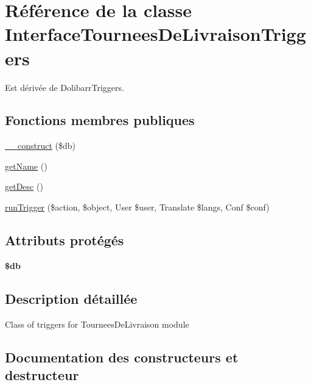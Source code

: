 \hypertarget{classInterfaceTourneesDeLivraisonTriggers}{}\section{Référence de la classe Interface\+Tournees\+De\+Livraison\+Triggers}
\label{classInterfaceTourneesDeLivraisonTriggers}


Est dérivée de Dolibarr\+Triggers.

\subsection*{Fonctions membres publiques}
\begin{DoxyCompactItemize}
\item 
\hyperlink{classInterfaceTourneesDeLivraisonTriggers_a6bc5250bff11d0e837a87370da9059ed}{\+\_\+\+\_\+construct} (\$db)
\item 
\hyperlink{classInterfaceTourneesDeLivraisonTriggers_aef5dadaa4fa37a89a1e362da148c7a85}{get\+Name} ()
\item 
\hyperlink{classInterfaceTourneesDeLivraisonTriggers_ad94600e78c409b1b3385a4c2f44bc0d4}{get\+Desc} ()
\item 
\hyperlink{classInterfaceTourneesDeLivraisonTriggers_a34392924822c757838c2580b021b30a0}{run\+Trigger} (\$action, \$object, User \$user, Translate \$langs, Conf \$conf)
\end{DoxyCompactItemize}
\subsection*{Attributs protégés}
\begin{DoxyCompactItemize}
\item 
\mbox{\label{classInterfaceTourneesDeLivraisonTriggers_a09fb07c238ffedd8d91911da6f1a7ef4}} 
{\bfseries \$db}
\end{DoxyCompactItemize}


\subsection{Description détaillée}
Class of triggers for Tournees\+De\+Livraison module 

\subsection{Documentation des constructeurs et destructeur}
\mbox{\label{classInterfaceTourneesDeLivraisonTriggers_a6bc5250bff11d0e837a87370da9059ed}} 
